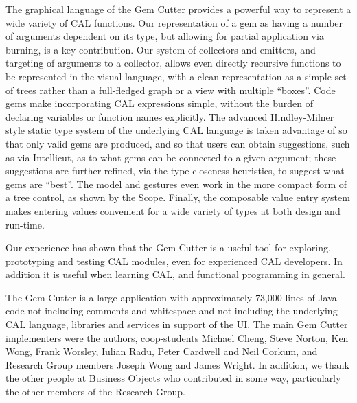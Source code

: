 \documentclass[preprint]{sigplanconf}
\begin{document}
The graphical language of the Gem Cutter provides a powerful way to
represent a wide variety of CAL functions. Our representation of a gem as having a
number of arguments dependent on its type, but allowing for partial
application via burning, is a key contribution. Our system of
collectors and emitters, and targeting of arguments to a collector,
allows even directly recursive functions to be represented in the
visual language, with a clean
representation as a simple set of trees rather than a full-fledged graph or a
view with multiple ``boxes''.  Code gems make incorporating CAL
expressions simple, without the burden of declaring variables or
function names explicitly. The advanced Hindley-Milner style static 
type system of the underlying CAL language is taken advantage of so
that only valid gems are produced, and so that users can obtain
suggestions, such as via Intellicut, as to what gems can be connected
to a given argument; these suggestions are further refined, via the type closeness heuristics,
to suggest what gems are ``best''. 
The model and gestures even work in the more
compact form of a tree control, as shown by the Scope. Finally, the
composable value entry system makes entering values convenient for a
wide variety of types at both design and run-time.

Our experience has shown that the Gem Cutter is a useful tool for exploring,
prototyping and testing CAL modules, even for experienced CAL developers.
In addition it is useful when learning CAL, and functional programming in general.

%

\acks

The Gem Cutter is a large application with approximately 73,000 lines
of Java code not including comments and whitespace and not including the
underlying CAL language, libraries and services in support of the UI. The main
Gem Cutter implementers were the authors, coop-students Michael Cheng,
Steve Norton, Ken Wong, Frank Worsley, Iulian Radu, Peter Cardwell and
Neil Corkum, and Research Group members Joseph Wong and James
Wright. In addition, we thank the other people at Business Objects who
contributed in some way, particularly the other members of the
Research Group.



\end{document}
